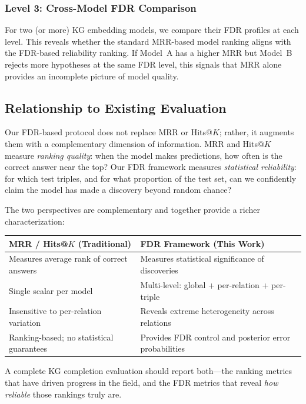 \subsubsection{Level 3: Cross-Model FDR Comparison}
For two (or more) KG embedding models, we compare their FDR profiles at each level.
This reveals whether the standard MRR-based model ranking aligns with the FDR-based reliability ranking.
If Model~A has a higher MRR but Model~B rejects more hypotheses at the same FDR level, this signals that MRR alone provides an incomplete picture of model quality.

\subsection{Relationship to Existing Evaluation}
\label{subsec:relationship}

Our FDR-based protocol does not replace MRR or Hits@$K$; rather, it augments them with a complementary dimension of information.
MRR and Hits@$K$ measure \emph{ranking quality}: when the model makes predictions, how often is the correct answer near the top?
Our FDR framework measures \emph{statistical reliability}: for which test triples, and for what proportion of the test set, can we confidently claim the model has made a discovery beyond random chance?

The two perspectives are complementary and together provide a richer characterization:

\begin{center}
\begin{tabular}{p{} p{}}
\toprule
\textbf{MRR / Hits@$K$ (Traditional)} & \textbf{FDR Framework (This Work)} \\
\midrule
Measures average rank of correct answers & Measures statistical significance of discoveries \\
Single scalar per model & Multi-level: global + per-relation + per-triple \\
Insensitive to per-relation variation & Reveals extreme heterogeneity across relations \\
Ranking-based; no statistical guarantees & Provides FDR control and posterior error probabilities \\
\bottomrule
\end{tabular}
\end{center}

A complete KG completion evaluation should report both---the ranking metrics that have driven progress in the field, and the FDR metrics that reveal \emph{how reliable} those rankings truly are.

